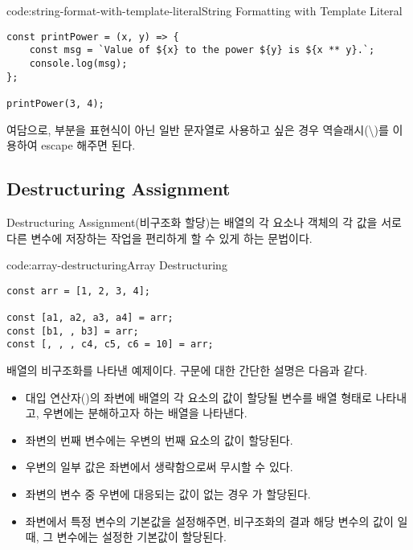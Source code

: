 \begin{codeenv}{code:string-format-with-template-literal}{String Formatting with Template Literal}\begin{verbatim}
const printPower = (x, y) => {
    const msg = `Value of ${x} to the power ${y} is ${x ** y}.`;
    console.log(msg);
};

printPower(3, 4);
\end{verbatim}
\end{codeenv}

여담으로, \cd{\$\{\}} 부분을 표현식이 아닌 일반 문자열로 사용하고 싶은 경우 역슬래시(\cd\textbackslash)를 이용하여 escape 해주면 된다.
\newpage

\subsection*{Destructuring Assignment}

Destructuring Assignment(비구조화 할당)는 배열의 각 요소나 객체의 각 값을 서로 다른 변수에 저장하는 작업을 편리하게 할 수 있게 하는 문법이다.

\begin{codeenv}{code:array-destructuring}{Array Destructuring}\begin{verbatim}
const arr = [1, 2, 3, 4];

const [a1, a2, a3, a4] = arr;
const [b1, , b3] = arr;
const [, , , c4, c5, c6 = 10] = arr;
\end{verbatim}
\end{codeenv}

\은 배열의 비구조화를 나타낸 예제이다. 구문에 대한 간단한 설명은 다음과 같다.

\begin{itemize}
    \item 대입 연산자(\cd{=})의 좌변에 배열의 각 요소의 값이 할당될 변수를 배열 형태로 나타내고, 우변에는 분해하고자 하는 배열을 나타낸다.
    \item 좌변의 번째 변수에는 우변의 번째 요소의 값이 할당된다.
    \item 우변의 일부 값은 좌변에서 생략함으로써 무시할 수 있다.
    \item 좌변의 변수 중 우변에 대응되는 값이 없는 경우 가 할당된다.
    \item 좌변에서 특정 변수의 기본값을 설정해주면, 비구조화의 결과 해당 변수의 값이 일 때, 그 변수에는 설정한 기본값이 할당된다.
\end{itemize}

